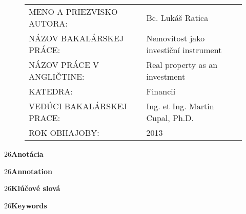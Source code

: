 \documentclass[12pt,twoside,openany]{fithesis}
\def\klicovaslova{\hspace{5mm} }%
\begin{document}

\FrontMatter %
\ThesisTitlePage %




     \begin{figure}[h!]	
\begin{tabular}{l l }
\uppercase{Meno a priezvisko autora:~~~~~}	& Bc. Lukáš Ratica	\\ \vspace{1mm}
\uppercase{NÁZOV BAKALÁRSKEJ PRÁCE:}	&	Nemovitost jako investiční instrument\\ \vspace{1mm}
\uppercase{NÁZOV PRÁCE V ANGLIČTINE:}	&	Real property as an investment \\ \vspace{1mm}
\uppercase{KATEDRA:}	&	Financií	\\ \vspace{1mm}
\uppercase{VEDÚCI BAKALÁRSKEJ PRACE:}	&	Ing. et Ing. Martin Cupal, Ph.D.	\\ \vspace{1mm}
\uppercase{Rok obhajoby:}	&	2013 \\
\end{tabular}
\end{figure}


\fontsize{18} {26}\textbf{Anotácia} 
\vspace{3mm} 

                                                            
\vspace{5mm}
\fontsize{18} {26}\textbf{Annotation} 
\vspace{3mm}

\vspace{5mm}

\fontsize{18} {26}\textbf{Klúčové slová} 
\vspace{3mm}

\klicovaslova
       
\vspace{5mm}
    
\fontsize{18} {26}\textbf{Keywords} 
\vspace{3mm}
\end{document}
